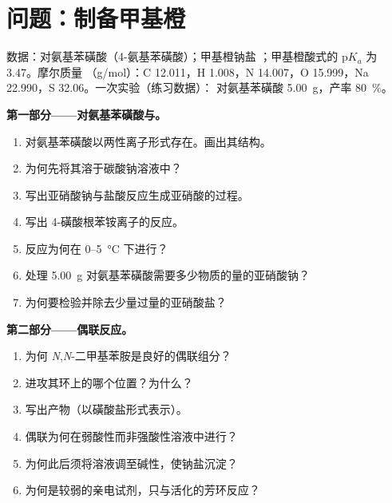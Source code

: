 \section{问题：制备甲基橙}

\begin{problem}
\label{pb:b2:amines:1}
数据：对氨基苯磺酸（4-氨基苯磺酸）；甲基橙钠盐
；甲基橙酸式的 $\mathrm pK_a$ 为 3.47。摩尔质量
（\unit{g/mol}）：C 12.011，H 1.008，N 14.007，O 15.999，Na 22.990，S 32.06。一次实验（练习数据）：
对氨基苯磺酸 \qty{5.00}{g}，产率 80~\%。

\medskip
\noindent\textbf{第一部分——对氨基苯磺酸与。}
\begin{enumerate}
  \item 对氨基苯磺酸以两性离子形式存在。画出其结构。
  \item 为何先将其溶于碳酸钠溶液中？
  \item 写出亚硝酸钠与盐酸反应生成亚硝酸的过程。
  \item 写出 4-磺酸根苯铵离子的反应。
  \item 反应为何在 0--\qty{5}{\degreeCelsius} 下进行？
  \item 处理 \qty{5.00}{g} 对氨基苯磺酸需要多少物质的量的亚硝酸钠？
  \item 为何要检验并除去少量过量的亚硝酸盐？
\end{enumerate}

\medskip
\noindent\textbf{第二部分——偶联反应。}
\begin{enumerate}[resume]
  \item 为何 \textit{N},\textit{N}-二甲基苯胺是良好的偶联组分？
  \item {}进攻其环上的哪个位置？为什么？
  \item 写出产物（以磺酸盐形式表示）。
  \item 偶联为何在弱酸性而非强酸性溶液中进行？
  \item 为何此后须将溶液调至碱性，使钠盐沉淀？
  \item 为何是较弱的亲电试剂，只与活化的芳环反应？
\end{enumerate}


\end{problem}

